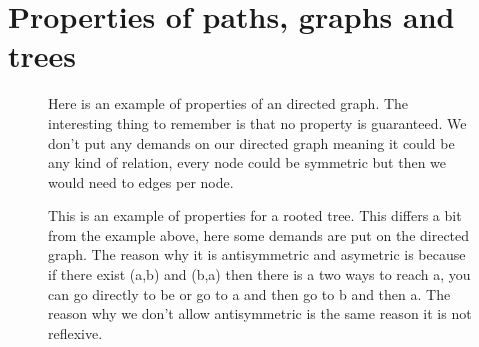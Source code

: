 \documentclass[a5paper]{article}
\begin{document}
\section*{Properties of paths, graphs and trees}
\begin{figure}[ht]
	\centering
	\caption*{Here is an example of properties of an directed graph. The interesting thing to remember is that no property is guaranteed.
	 We don't put any demands on our directed graph meaning it could be any kind of relation, every node could be symmetric but then we would need to edges per node. 
	}\label{fig:2017_1-5-1}
\end{figure}

\begin{figure}[ht]
	\centering
	\caption*{This is an example of properties for a rooted tree. This differs a bit from the example above, here some demands are put on the directed graph.
	 The reason why it is antisymmetric and asymetric is because if there exist (a,b) and (b,a) then there is a two ways to reach a, you can go directly to be or go to a and then go to b and then a. The reason why we don't allow antisymmetric is the same reason it is not reflexive.
	}\label{fig:2017_1-6-1}
\end{figure}
\end{document}
